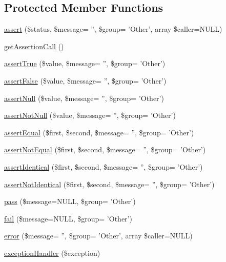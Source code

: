 \subsection*{Protected Member Functions}
\begin{DoxyCompactItemize}
\item 
\hyperlink{class_drupal_test_case_ae4722b337aa79fcd753a2fc0c2f0b179}{assert} (\$status, \$message= '', \$group= 'Other', array \$caller=NULL)
\item 
\hyperlink{class_drupal_test_case_a6129193cb03df38244d6149bf88b7c0c}{getAssertionCall} ()
\item 
\hyperlink{class_drupal_test_case_a05171bcd0d7a73b1164502e6477423ff}{assertTrue} (\$value, \$message= '', \$group= 'Other')
\item 
\hyperlink{class_drupal_test_case_a8dbe449ccfc164f64d07a42337e51747}{assertFalse} (\$value, \$message= '', \$group= 'Other')
\item 
\hyperlink{class_drupal_test_case_ab04d0a088003f5e7aac49a4888710cc8}{assertNull} (\$value, \$message= '', \$group= 'Other')
\item 
\hyperlink{class_drupal_test_case_a94d00b7ee53b58205fe55ddc9bff788a}{assertNotNull} (\$value, \$message= '', \$group= 'Other')
\item 
\hyperlink{class_drupal_test_case_ab55dd157dcaed13231e0071a9f114878}{assertEqual} (\$first, \$second, \$message= '', \$group= 'Other')
\item 
\hyperlink{class_drupal_test_case_a76593bb498385ecbbfb9ea3721b1da83}{assertNotEqual} (\$first, \$second, \$message= '', \$group= 'Other')
\item 
\hyperlink{class_drupal_test_case_afe08222abaa77bc367b110804c374298}{assertIdentical} (\$first, \$second, \$message= '', \$group= 'Other')
\item 
\hyperlink{class_drupal_test_case_a77cb46d51231f322d73e12a9ffa92b45}{assertNotIdentical} (\$first, \$second, \$message= '', \$group= 'Other')
\item 
\hyperlink{class_drupal_test_case_a9ced458583ee9de3d82ab1cc09009a01}{pass} (\$message=NULL, \$group= 'Other')
\item 
\hyperlink{class_drupal_test_case_ae90616a11b0e3df050113d79765dc226}{fail} (\$message=NULL, \$group= 'Other')
\item 
\hyperlink{class_drupal_test_case_a4155c3ed4cbf233c259301427dee59fb}{error} (\$message= '', \$group= 'Other', array \$caller=NULL)
\item 
\hyperlink{class_drupal_test_case_ab7cf6472833e2d3fd4de5831cfd61af9}{exceptionHandler} (\$exception)
\end{DoxyCompactItemize}
